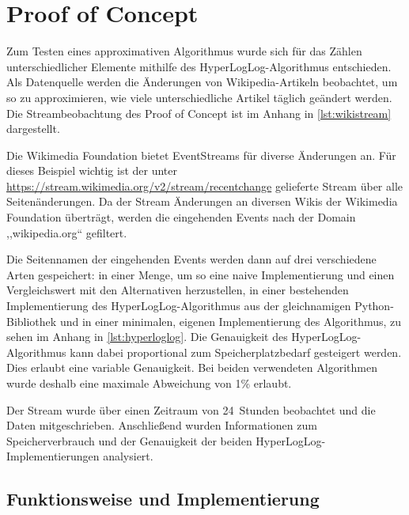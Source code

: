 \section{Proof of Concept}

Zum Testen eines approximativen Algorithmus wurde sich für das Zählen unterschiedlicher Elemente mithilfe des HyperLogLog-Algorithmus entschieden.
Als Datenquelle werden die Änderungen von Wikipedia-Artikeln beobachtet, um so zu approximieren, wie viele unterschiedliche Artikel täglich geändert werden.
Die Streambeobachtung des Proof of Concept ist im Anhang in \autoref{lst:wikistream} dargestellt.

Die Wikimedia Foundation bietet EventStreams für diverse Änderungen an.
Für dieses Beispiel wichtig ist der unter \url{https://stream.wikimedia.org/v2/stream/recentchange} gelieferte Stream über alle Seitenänderungen.
Da der Stream Änderungen an diversen Wikis der Wikimedia Foundation überträgt, werden die eingehenden Events nach der Domain ,,wikipedia.org`` gefiltert.

Die Seitennamen der eingehenden Events werden dann auf drei verschiedene Arten gespeichert:  in einer Menge, um so eine naive Implementierung und einen Vergleichswert mit den Alternativen herzustellen, in einer bestehenden Implementierung des HyperLogLog-Algorithmus aus der gleichnamigen Python-Bibliothek \cite{evseenko2018} und in einer minimalen, eigenen Implementierung des Algorithmus, zu sehen im Anhang in \autoref{lst:hyperloglog}.
Die Genauigkeit des HyperLogLog-Algorithmus kann dabei proportional zum Speicherplatzbedarf gesteigert werden.
Dies erlaubt eine variable Genauigkeit.
Bei beiden verwendeten Algorithmen wurde deshalb eine maximale Abweichung von 1\% erlaubt.

Der Stream wurde über einen Zeitraum von 24~Stunden beobachtet und die Daten mitgeschrieben.
Anschließend wurden Informationen zum Speicherverbrauch und der Genauigkeit der beiden HyperLogLog-Implementierungen analysiert.

\subsection{Funktionsweise und Implementierung}
\label{sec:proof-of-concept-funktionsweise}

